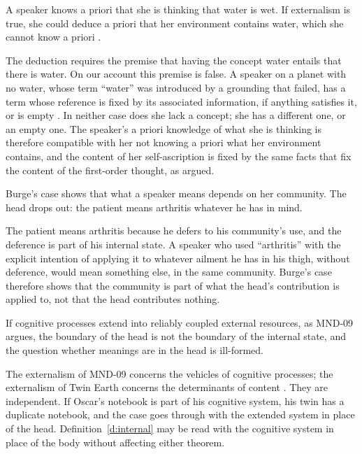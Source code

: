 \documentclass{situationist-preprint}
\begin{document}
\begin{objection}
A speaker knows a priori that she is thinking that water is wet. If externalism is true, she could deduce a priori that her environment contains water, which she cannot know a priori \citep{McKinsey1991}.
\end{objection}

\begin{reply}
The deduction requires the premise that having the concept water entails that there is water. On our account this premise is false. A speaker on a planet with no water, whose term \enquote{water} was introduced by a grounding that failed, has a term whose reference is fixed by its associated information, if anything satisfies it, or is empty \citep{Boghossian1997}. In neither case does she lack a concept; she has a different one, or an empty one. The speaker's a priori knowledge of what she is thinking is therefore compatible with her not knowing a priori what her environment contains, and the content of her self-ascription is fixed by the same facts that fix the content of the first-order thought, as \citet{Burge1988} argued.
\end{reply}

\begin{objection}
Burge's case shows that what a speaker means depends on her community. The head drops out: the patient means arthritis whatever he has in mind.
\end{objection}

\begin{reply}
The patient means arthritis because he defers to his community's use, and the deference is part of his internal state. A speaker who used \enquote{arthritis} with the explicit intention of applying it to whatever ailment he has in his thigh, without deference, would mean something else, in the same community. Burge's case therefore shows that the community is part of what the head's contribution is applied to, not that the head contributes nothing.
\end{reply}

\begin{objection}
If cognitive processes extend into reliably coupled external resources, as MND-09 argues, the boundary of the head is not the boundary of the internal state, and the question whether meanings are in the head is ill-formed.
\end{objection}

\begin{reply}
The externalism of MND-09 concerns the vehicles of cognitive processes; the externalism of Twin Earth concerns the determinants of content \citep{ClarkChalmers1998}. They are independent. If Oscar's notebook is part of his cognitive system, his twin has a duplicate notebook, and the case goes through with the extended system in place of the head. Definition~\ref{d:internal} may be read with the cognitive system in place of the body without affecting either theorem.
\end{reply}
\end{document}
